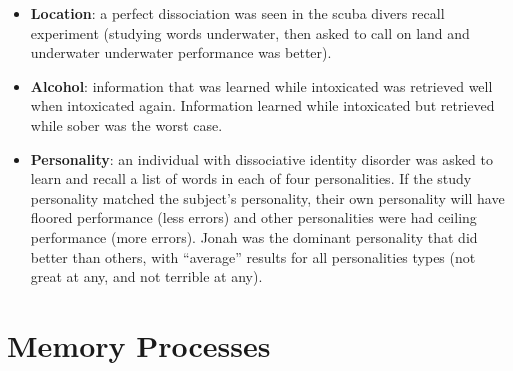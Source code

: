 \documentclass[]{article}
\newcommand{\lecture}[1]{\marginpar{{\footnotesize $\leftarrow$ \underline{#1}}}}
\begin{document}
\begin{itemize}
					\begin{itemize}
						\item \textbf{Location}: a perfect dissociation was seen in the scuba divers recall experiment (studying words underwater, then asked to call on land and underwater \textendash{} underwater performance was better).
						\item \textbf{Alcohol}: information that was learned while intoxicated was retrieved well when intoxicated again. Information learned while intoxicated but retrieved while sober was the worst case.
						\item \textbf{Personality}: an individual with dissociative identity disorder was asked to learn and recall a list of words in each of four personalities. If the study personality matched the subject's personality, their own personality will have floored performance (less errors) and other personalities were had ceiling performance (more errors). Jonah was the dominant personality that did better than others, with ``average'' results for all personalities types (not great at any, and not terrible at any).
					\end{itemize}
			\end{itemize}
	\section{Memory Processes} \lecture{February 12, 2013}
\end{document}
